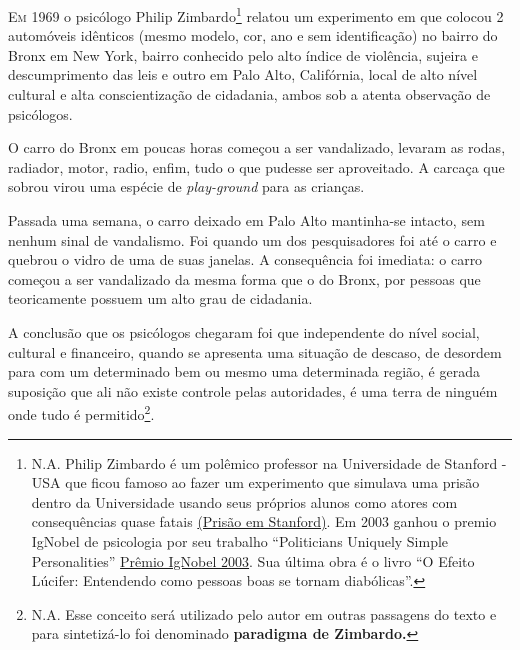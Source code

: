 \documentclass[
	12pt,				%
	openright,			%
	twoside,			%
	a4paper,			%
	chapter=TITLE,		%
	section=TITLE,		%
	subsection=TITLE,	%
	subsubsection=TITLE,%
	spanish,            %
	english,			%
	brazil				%
	]{abntex2}
\begin{document}
\lettrine[lines=2, lhang=0.33, loversize=0.25]{E}{m} 1969 o psicólogo Philip Zimbardo\footnote{N.A. Philip Zimbardo é um polêmico professor na Universidade de Stanford - USA que ficou famoso ao fazer um experimento que simulava uma prisão dentro da Universidade usando seus próprios alunos como atores com consequências quase fatais \href{http://www.prisonexp.org/portuguese-1/}{(Prisão em Stanford)}. Em 2003 ganhou o premio IgNobel de psicologia por seu trabalho “Politicians Uniquely Simple Personalities” \href{http://www.improbable.com/ig/ig-pastwinners.html\#ig2003}{Prêmio IgNobel 2003}. Sua última obra é o livro “O Efeito Lúcifer: Entendendo como pessoas boas se tornam diabólicas”.} relatou um experimento em que colocou 2 automóveis idênticos (mesmo modelo, cor, ano e sem identificação) no bairro do Bronx em New York, bairro conhecido pelo alto índice de violência, sujeira e descumprimento das leis e outro em Palo Alto, Califórnia, local de alto nível cultural e alta conscientização de cidadania, ambos sob a atenta observação de psicólogos.
\par
O carro do Bronx em poucas horas começou a ser vandalizado, levaram as rodas, radiador, motor, radio, enfim, tudo o que pudesse ser aproveitado. A carcaça que sobrou virou uma espécie de \textit{play-ground} para as crianças.
\par
Passada uma semana, o carro deixado em Palo Alto mantinha-se intacto, sem nenhum sinal de vandalismo. Foi quando um dos pesquisadores foi até o carro e quebrou o vidro de uma de suas janelas. A consequência foi imediata: o carro começou a ser vandalizado da mesma forma que o do Bronx, por pessoas que teoricamente possuem um alto grau de cidadania.
\par
A conclusão que os psicólogos chegaram foi que independente do nível social, cultural e financeiro, quando se apresenta uma situação de descaso, de desordem para com um determinado bem ou mesmo uma determinada região, é gerada suposição que ali não existe controle pelas autoridades, é uma terra de ninguém onde tudo é permitido\footnote{N.A. Esse conceito será utilizado pelo autor em outras passagens do texto e para sintetizá-lo foi denominado \textbf{paradigma de Zimbardo.}}.
\par
\end{document}
